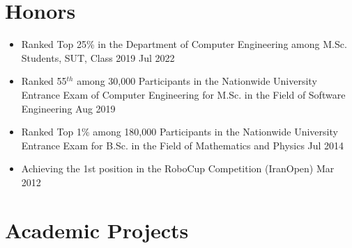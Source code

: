 \documentclass[11pt]{article}
\begin{document}
\section{Honors}
\begin{itemize}
	\renewcommand\labelitemi{\ding{118}}
	\item{Ranked Top 25\% in the Department of Computer Engineering among M.Sc. Students, SUT, Class 2019 \hfill Jul 2022}\vspace{-2mm}
	\item {Ranked 55$^{th}$ among 30,000 Participants in the Nationwide University Entrance Exam of Computer Engineering for M.Sc. in the Field of Software Engineering \hfill Aug 2019}\vspace{-2mm}
	\item{Ranked Top 1\% among 180,000 Participants in the Nationwide University Entrance Exam for B.Sc. in the Field of Mathematics and Physics  \hfill Jul 2014}
	\item{Achieving the 1st position in the RoboCup Competition (IranOpen)  \hfill Mar 2012}\vspace{-2mm}
\end{itemize}


\section{Academic Projects}
\end{document}

